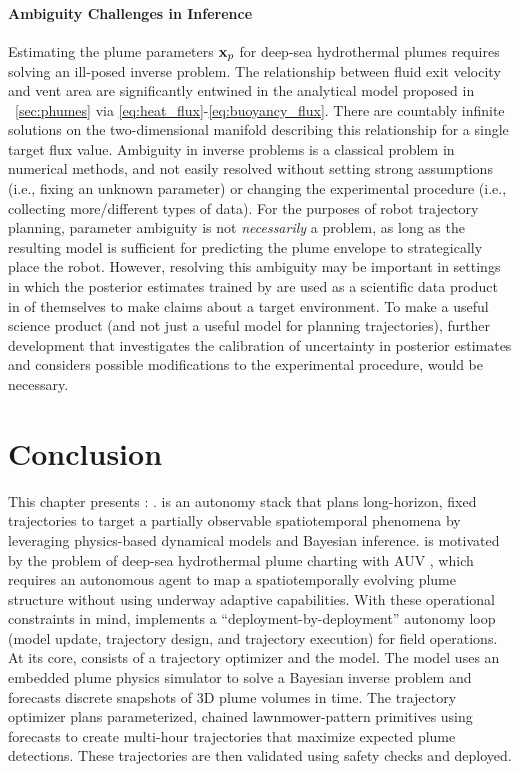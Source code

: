 \paragraph{Ambiguity Challenges in Inference}
Estimating the plume parameters $\mathbf{x}_p$ for deep-sea hydrothermal plumes requires solving an ill-posed inverse problem. The relationship between fluid exit velocity and vent area are significantly entwined in the analytical model proposed in ~\cref{sec:phumes} via \cref{eq:heat_flux}-\cref{eq:buoyancy_flux}. There are countably infinite solutions on the two-dimensional manifold describing this relationship for a single target flux value. Ambiguity in inverse problems is a classical problem in numerical methods, and not easily resolved without setting strong assumptions (i.e., fixing an unknown parameter) or changing the experimental procedure (i.e., collecting more/different types of data). For the purposes of robot trajectory planning, parameter ambiguity is not \emph{necessarily} a problem, as long as the resulting model is sufficient for predicting the plume envelope to strategically place the robot. However, resolving this ambiguity may be important in settings in which the posterior estimates trained by \PHUMES are used as a scientific data product in of themselves to make claims about a target environment. To make \PHUMES a useful science product (and not just a useful model for planning trajectories), further development that investigates the calibration of uncertainty in posterior estimates and considers possible modifications to the experimental procedure, would be necessary. 


\section{Conclusion}
\label{sec:conclusion}
This chapter presents \PHORTEX: \phortex. \PHORTEX is an autonomy stack that plans long-horizon, fixed trajectories to target a partially observable spatiotemporal phenomena by leveraging physics-based dynamical models and Bayesian inference. \PHORTEX is motivated by the problem of deep-sea hydrothermal plume charting with AUV \Sentry, which requires an autonomous agent to map a spatiotemporally evolving plume structure without using underway adaptive capabilities. With these operational constraints in mind, \PHORTEX implements a ``deployment-by-deployment'' autonomy loop (model update, trajectory design, and trajectory execution) for field operations. At its core, \PHORTEX consists of a trajectory optimizer and the \PHUMES model. The \PHUMES model uses an embedded plume physics simulator to solve a Bayesian inverse problem and forecasts discrete snapshots of 3D plume volumes in time. The trajectory optimizer plans parameterized, chained lawnmower-pattern primitives using \PHUMES forecasts to create multi-hour trajectories that maximize expected plume detections. These trajectories are then validated using \Sentry safety checks and deployed. 

